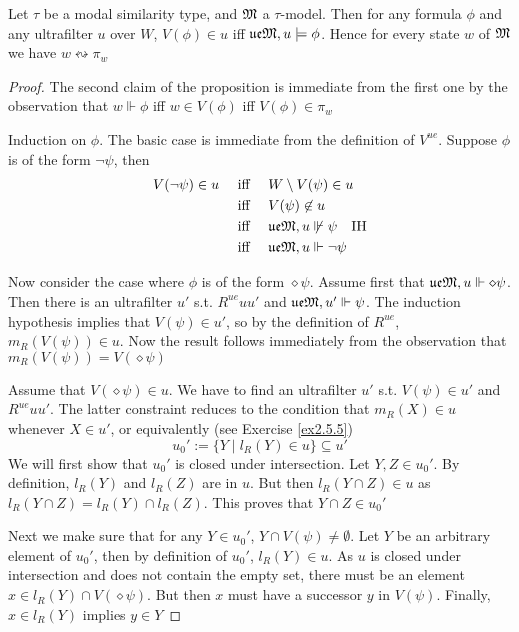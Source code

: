 \documentclass[11pt]{article}
\newcommand{\ue}{\fu\fe}
\begin{document}
\begin{proposition}[]
\label{prop2.59}
Let \(\tau\) be a modal similarity type, and \(\mathfrak{M}\) a \(\tau\)-model. Then for any
formula \(\phi\) and any ultrafilter \(u\) over \(W\), \(V(\phi)\in u\) iff
\(\ue\fM,u\models\phi\). Hence for every state \(w\) of \(\mathfrak{M}\) we have
\(w\leftrightsquigarrow \pi_w\)
\end{proposition}

\begin{proof}
The second claim of the proposition is immediate from the first one by the
observation that \(w\Vdash\phi\) iff \(w\in V(\phi)\) iff \(V(\phi)\in\pi_w\)

Induction on \(\phi\). The basic case is immediate from the definition of
\(V^{ue}\). Suppose \(\phi\) is of the form \(\neg\psi\), then
\begin{align*}
V(\neg\psi)\in u&\quad\text{ iff }\quad
W\setminus V(\psi)\in u\\
&\quad\text{ iff }\quad V(\psi)\not\in u\\
&\quad\text{ iff }\quad \ue\fM,u\not\Vdash\psi\quad\text{IH}\\
&\quad\text{ iff }\quad \ue\fM,u\Vdash\neg\psi
\end{align*}

Now consider the case where \(\phi\) is of the form \(\diamond\psi\). Assume first
that \(\ue\fM,u\Vdash\diamond\psi\). Then there is an ultrafilter \(u'\)
s.t. \(R^{ue}uu'\) and \(\ue\fM,u'\Vdash\psi\). The induction hypothesis
implies that \(V(\psi)\in u'\), so by the definition of \(R^{ue}\),
\(m_R(V(\psi))\in u\). Now the result follows immediately from the observation
that \(m_R(V(\psi))=V(\diamond\psi)\)

Assume that \(V(\diamond\psi)\in u\). We have to find an ultrafilter \(u'\)
s.t. \(V(\psi)\in u'\) and \(R^{ue}uu'\). The latter constraint reduces to the
condition that \(m_R(X)\in u\) whenever \(X\in u'\), or equivalently (see
Exercise \ref{ex2.5.5})
\begin{equation*}
u_0':=\{Y\mid l_R(Y)\in u\}\subseteq u'
\end{equation*}
We will first show that \(u_0'\) is closed under intersection. Let \(Y,Z\in
    u_0'\). By definition, \(l_R(Y)\) and \(l_R(Z)\) are in \(u\). But then
\(l_R(Y\cap Z)\in u\) as \(l_R(Y\cap Z)=l_R(Y)\cap l_R(Z)\). This proves
that \(Y\cap Z\in u_0'\)

Next we make sure that for any \(Y\in u_0'\), \(Y\cap V(\psi)\neq\emptyset\).
Let \(Y\) be an arbitrary element of \(u_0'\), then by definition of
\(u_0'\), \(l_R(Y)\in u\). As \(u\) is closed under intersection and does
not contain the empty set, there must be an element \(x\in l_R(Y)\cap
    V(\diamond\psi)\). But then \(x\) must have a successor \(y\) in \(V(\psi)\).
Finally, \(x\in l_R(Y)\) implies \(y\in Y\)


\end{proof}
\end{document}
